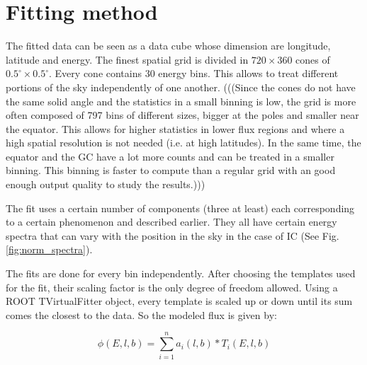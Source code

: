 
\newpage
\section{Fitting method}
\label{sec:fitting_method}


The fitted data can be seen as a data cube whose dimension are longitude, latitude and energy. The finest spatial grid is divided in $720 \times 360$ cones of $ 0.5^\circ \times 0.5^\circ $. Every cone contains 30 energy bins. This allows to treat different portions of the sky independently of one another.
(((Since the cones do not have the same solid angle and the statistics in a small binning is low, the grid is more often composed of 797 bins of different sizes, bigger at the poles and smaller near the equator. This allows for higher statistics in lower flux regions and where a high spatial resolution is not needed (i.e. at high latitudes). In the same time, the equator and the GC have a lot more counts and can be treated in a smaller binning. This binning is faster to compute than a regular grid with an good enough output quality to study the results.)))

The fit uses a certain number of components (three at least) each corresponding to a certain phenomenon and described earlier. They all have certain energy spectra that can vary with the position in the sky in the case of IC (See Fig. \ref{fig:norm_spectra}).

The fits are done for every bin independently. After choosing the templates used for the fit, their scaling factor is the only degree of freedom allowed. Using a ROOT TVirtualFitter object, every template is scaled up or down until its sum comes the closest to the data. So the modeled flux is given by:

\begin{equation}
\phi(E,l,b) = \sum_{i=1}^{n} a_i(l,b)*T_i(E,l,b)
\end{equation}

